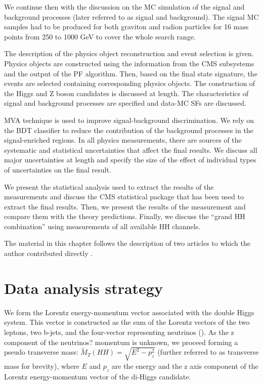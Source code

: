 We continue then with the discussion on the MC simulation of the signal and background processes (later referred to as signal and background). The signal MC samples had to be produced for both graviton and radion particles for 16 mass points from 250 to 1000 GeV to cover the whole search range.  

The description of the physics object reconstruction and event selection is given. Physics objects are constructed using the information from the CMS subsystems and the output of the PF algorithm. Then, based on the final state signature, the events are selected containing corresponding physics objects. The construction of the Higgs and Z boson candidates is discussed at length. The characteristics of signal and background processes are specified and data-MC SFs are discussed.

MVA technique is used to improve signal-background discrimination. We rely on the BDT classifier to reduce the contribution of the background processes in the signal-enriched regions. In all physics measurements, there are sources of the systematic and statistical uncertainties that affect the final results. We discuss all major uncertainties at length and specify the size of the effect of individual types of uncertainties on the final result. 

We present the statistical analysis used to extract the results of the measurements and discuss the CMS statistical package that has been used to extract the final results. Then, we present the results of the measurement and compare them with the theory predictions. Finally, we discuss the ``grand HH combination'' using measurements of all available HH channels.

The material in this chapter follows the description of two articles to which the author contributed directly \cite{bbZZAN, CMS-PAS-HIG-17-032}.

\section{Data analysis strategy}
\label{sec:strategy}
We form the Lorentz energy-momentum vector associated with the double Higgs system. This vector is constructed as the sum  of  the  Lorentz  vectors  of  the  two  leptons,  two  b-jets,  and  the  four-vector  representing neutrinos (\PTslash).  As the z component of the neutrinos? momentum is unknown, we proceed forming a pseudo transverse mass:
$\tilde{M}_T(HH) = \sqrt{E^2 - p_{z}^2}$ (further referred to as transverse mass for brevity), where $E$ and $p_z$ are the energy and the z axis component of the Lorentz energy-momentum vector of the di-Higgs candidate.


